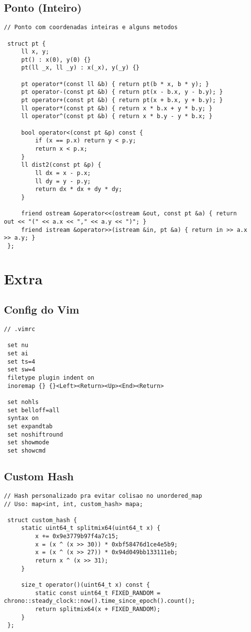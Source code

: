 \documentclass[11pt, a4paper, twoside]{article}
\begin{document}
\subsection{Ponto (Inteiro)}
\begin{lstlisting}
// Ponto com coordenadas inteiras e alguns metodos

 struct pt {
     ll x, y;
     pt() : x(0), y(0) {}
     pt(ll _x, ll _y) : x(_x), y(_y) {}
 
     pt operator*(const ll &b) { return pt(b * x, b * y); }
     pt operator-(const pt &b) { return pt(x - b.x, y - b.y); }
     pt operator+(const pt &b) { return pt(x + b.x, y + b.y); }
     ll operator*(const pt &b) { return x * b.x + y * b.y; }
     ll operator^(const pt &b) { return x * b.y - y * b.x; }
 
     bool operator<(const pt &p) const {
         if (x == p.x) return y < p.y;
         return x < p.x;
     }
     ll dist2(const pt &p) {
         ll dx = x - p.x;
         ll dy = y - p.y;
         return dx * dx + dy * dy;
     }
 
     friend ostream &operator<<(ostream &out, const pt &a) { return out << "(" << a.x << "," << a.y << ")"; }
     friend istream &operator>>(istream &in, pt &a) { return in >> a.x >> a.y; }
 };
\end{lstlisting}

\pagebreak


%
%

\section{Extra}

\subsection{Config do Vim}
\begin{lstlisting}
// .vimrc

 set nu
 set ai
 set ts=4
 set sw=4
 filetype plugin indent on
 inoremap {} {}<Left><Return><Up><End><Return> 
 
 set nohls
 set belloff=all
 syntax on
 set expandtab
 set noshiftround
 set showmode
 set showcmd
\end{lstlisting}

\subsection{Custom Hash}
\begin{lstlisting}
// Hash personalizado pra evitar colisao no unordered_map
// Uso: map<int, int, custom_hash> mapa;

 struct custom_hash {
     static uint64_t splitmix64(uint64_t x) {
         x += 0x9e3779b97f4a7c15;
         x = (x ^ (x >> 30)) * 0xbf58476d1ce4e5b9;
         x = (x ^ (x >> 27)) * 0x94d049bb133111eb;
         return x ^ (x >> 31);
     }
 
     size_t operator()(uint64_t x) const {
         static const uint64_t FIXED_RANDOM = chrono::steady_clock::now().time_since_epoch().count();
         return splitmix64(x + FIXED_RANDOM);
     }
 };
\end{lstlisting}
\end{document}
